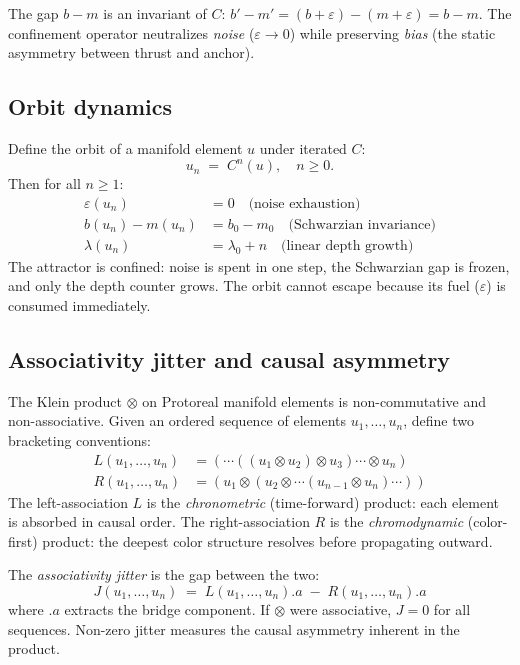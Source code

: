 \begin{proposition}
\label{prop:schwarzian}
The gap $b - m$ is an invariant of $C$:
$b' - m' = (b + \varepsilon) - (m + \varepsilon) = b - m$.
The confinement operator neutralizes \emph{noise}
($\varepsilon \to 0$) while preserving \emph{bias}
(the static asymmetry between thrust and anchor).
\end{proposition}

\subsection{Orbit dynamics}

Define the orbit of a manifold element $u$ under iterated $C$:
\[
u_n \;=\; C^n(u), \quad n \geq 0.
\]
Then for all $n \geq 1$:
\begin{align}
\varepsilon(u_n) &= 0 \quad \text{(noise exhaustion)} \\
b(u_n) - m(u_n) &= b_0 - m_0 \quad \text{(Schwarzian invariance)} \\
\lambda(u_n) &= \lambda_0 + n \quad \text{(linear depth growth)}
\end{align}
The attractor is confined: noise is spent in one step,
the Schwarzian gap is frozen, and only the depth counter
grows. The orbit cannot escape because its fuel ($\varepsilon$)
is consumed immediately.

\subsection{Associativity jitter and causal asymmetry}

The Klein product $\otimes$ on Protoreal manifold elements is
non-commutative and non-associative. Given an ordered sequence
of elements $u_1, \ldots, u_n$, define two bracketing conventions:
\begin{align}
L(u_1, \ldots, u_n) &= (\cdots((u_1 \otimes u_2) \otimes u_3) \cdots \otimes u_n) \\
R(u_1, \ldots, u_n) &= (u_1 \otimes (u_2 \otimes \cdots (u_{n-1} \otimes u_n) \cdots))
\end{align}
The left-association $L$ is the \emph{chronometric} (time-forward)
product: each element is absorbed in causal order. The
right-association $R$ is the \emph{chromodynamic} (color-first)
product: the deepest color structure resolves before propagating
outward.

The \emph{associativity jitter} is the gap between the two:
\[
J(u_1, \ldots, u_n) \;=\; L(u_1, \ldots, u_n).a \;-\; R(u_1, \ldots, u_n).a
\]
where $.a$ extracts the bridge component. If $\otimes$ were
associative, $J = 0$ for all sequences. Non-zero jitter
measures the causal asymmetry inherent in the product.

